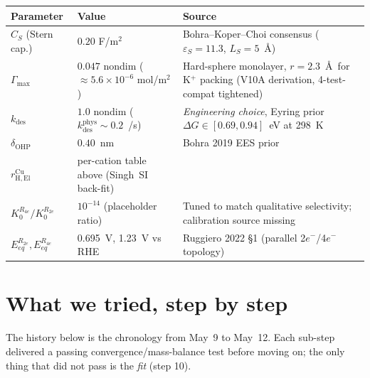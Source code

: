 \documentclass[11pt]{article}
\begin{document}
\begin{center}\footnotesize
\renewcommand{\arraystretch}{1.25}
\begin{tabular}{@{}p{2.8cm}p{4.4cm}p{6.1cm}@{}}
\toprule
\textbf{Parameter} & \textbf{Value} & \textbf{Source} \\
\midrule
$C_S$ (Stern cap.) & $0.20$ F/m$^2$ & Bohra--Koper--Choi consensus
  ($\varepsilon_S = 11.3$, $L_S = 5$~\AA) \\
$\Gamma_{\max}$ & $0.047$ nondim ($\approx 5.6\times 10^{-6}$ mol/m$^2$) &
  Hard-sphere monolayer, $r=2.3$~\AA\ for K$^+$ packing (V10A
  derivation, 4-test-compat tightened) \\
$k_{\mathrm{des}}$ & $1.0$ nondim ($k_{\mathrm{des}}^{\mathrm{phys}}\sim 0.2$~/s) &
  \emph{Engineering choice}, Eyring prior $\Delta G \in [0.69, 0.94]$~eV at 298~K \\
$\delta_{\mathrm{OHP}}$ & $0.40$~nm & Bohra 2019 EES prior \\
$r_{\mathrm{H,El}}^{\mathrm{Cu}}$ & per-cation table above (Singh~SI back-fit) & \\
$K_0^{R_{4e}}/K_0^{R_{2e}}$ & $10^{-14}$ (placeholder ratio) &
  Tuned to match qualitative selectivity; calibration source missing \\
$E_{eq}^{R_{2e}}, E_{eq}^{R_{4e}}$ & 0.695~V, 1.23~V vs RHE &
  Ruggiero 2022 §1 (parallel 2$e^-$/4$e^-$ topology) \\
\bottomrule
\end{tabular}
\end{center}

\section{What we tried, step by step}
\label{sec:tried}

The history below is the chronology from May~9 to May~12.  Each
sub-step delivered a passing convergence/mass-balance test before
moving on; the only thing that did not pass is the \emph{fit} (step
10).
\end{document}
